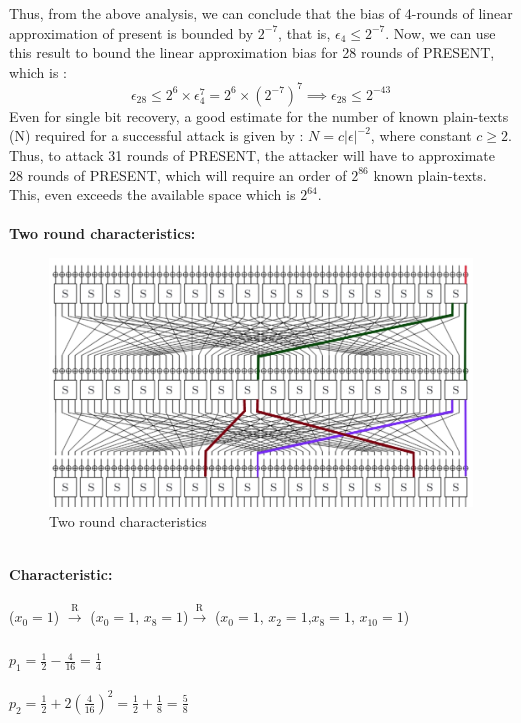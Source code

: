 \documentclass[journal=tosc,preprint]{iacrtrans}
\begin{document}
Thus, from the above analysis, we can conclude that the bias of 4-rounds of linear approximation of present is bounded by $2^{-7}$, that is, $\epsilon_4 \leq 2^{-7}$. Now, we can use this result to bound the linear approximation bias for 28 rounds of PRESENT, which is :
\begin{equation*}
\epsilon_{28} \leq 2^{6} \times \epsilon_4^{7} = 2^6 \times (2^{-7})^7 \implies \epsilon_{28} \leq 2^{-43}
\end{equation*}
Even for single bit recovery, a good estimate for the number of known plain-texts (N) required for a successful attack is given by : $N = c|\epsilon|^{-2}$, where constant $c \geq 2$. Thus, to attack 31 rounds of PRESENT, the attacker will have to approximate 28 rounds of PRESENT, which will require an order of $2^{86}$ known plain-texts. This, even exceeds the available space which is $2^{64}$.\\\\
\textbf{Two round characteristics:}
\begin{figure}[h!]
	\centering
	\includegraphics[width=1.0\linewidth, height=0.32\textheight]{LC2}
	\caption{Two round characteristics}
	\label{fig:lc2}
\end{figure}\\
\textbf{Characteristic:}\\\\
	($x_0 = 1$) $\xrightarrow[]{\text{R}}$ ($x_0 = 1$, $x_8 = 1$)$\xrightarrow[]{\text{R}}$ ($x_0 = 1$, $x_2 = 1$,$x_8 = 1$, $x_{10} = 1$)\\\\
	$p_1= \frac{1}{2}-\frac{4}{16}=\frac{1}{4}$\\\\
	$p_2=\frac{1}{2}+2(\frac{4}{16})^2=\frac{1}{2}+\frac{1}{8}=\frac{5}{8}$\\\\\\
\end{document}

